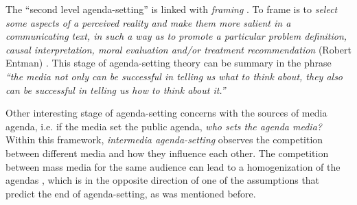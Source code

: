 \par The ``second level agenda-setting'' is linked with \textit{framing} \cite{guggenheim2015dynamics} \cite{tsur2015frame}. 
To frame is to \textit{select some aspects of a perceived reality and make them more salient in a communicating text, in such a way as to promote a particular problem definition, causal interpretation, moral evaluation and/or treatment recommendation} (Robert Entman) \cite{mccombs2005look}.
This stage of agenda-setting theory can be summary in the phrase \textit{``the media not only can be successful in telling us what to think about, they also can be successful in telling us how to think about it.''} 

\par Other interesting stage of agenda-setting concerns with the sources of media agenda, i.e. if the media set the public agenda, \textit{who sets the agenda media?} 
Within this framework, \textit{intermedia agenda-setting} observes the competition between different media and how they influence each other.
The competition between mass media for the same audience can lead to a homogenization of the agendas \cite{vargo2017networks}, which is in the opposite direction of one of the assumptions that predict the end of agenda-setting, as was mentioned before.

